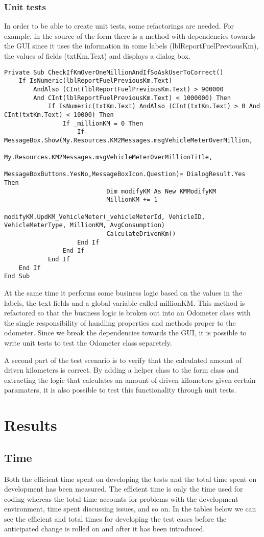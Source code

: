 \documentclass{article}
\begin{document}
			\subsubsection{Unit tests}

			In order to be able to create unit tests, some refactorings are needed. For example, in the source of the form there is a method with dependencies towards the GUI since it uses the information in some labels (lblReportFuelPreviousKm), the values of fields (txtKm.Text) and displays a dialog box.
			\begin{lstlisting}
Private Sub CheckIfKmOverOneMillionAndIfSoAskUserToCorrect()
	If IsNumeric(lblReportFuelPreviousKm.Text) 
		AndAlso (CInt(lblReportFuelPreviousKm.Text) > 900000 	
		And CInt(lblReportFuelPreviousKm.Text) < 1000000) Then
			If IsNumeric(txtKm.Text) AndAlso (CInt(txtKm.Text) > 0 And CInt(txtKm.Text) < 10000) Then
				If _millionKM = 0 Then
					If MessageBox.Show(My.Resources.KM2Messages.msgVehicleMeterOverMillion,
						My.Resources.KM2Messages.msgVehicleMeterOverMillionTitle,
						MessageBoxButtons.YesNo,MessageBoxIcon.Question)= DialogResult.Yes Then
							Dim modifyKM As New KMModifyKM 
							MillionKM += 1
							modifyKM.UpdKM_VehicleMeter(_vehicleMeterId, VehicleID, VehicleMeterType, MillionKM, AvgConsumption)
							CalculateDrivenKm()
					End If
				End If
			End If
	End If
End Sub
		\end{lstlisting}

			At the same time it performs some business logic based on the values in the labels, the text fields and a global variable called millionKM.
			This method is refactored so that the business logic is broken out into an Odometer class with the single responsibility of handling properties and methods proper to the odometer. Since we break the dependencies towards the GUI, it is possible to write unit tests to test the Odometer class separetely.

			A second part of the test scenario is to verify that the calculated amount of driven kilometers is correct. By adding a helper class to the form class and extracting the logic that calculates an amount of driven kilometers given certain paramaters, it is also possible to test this functionality through unit tests.

	\section{Results}
		\subsection{Time}
		Both the efficient time spent on developing the tests and the total time spent on development has been measured. The efficient time is only the time used for coding whereas the total time accounts for problems with the development environment, time spent discussing issues, and so on.
		In the tables below we can see the efficient and total times for developing the test cases before the anticipated change is rolled on and after it has been introduced.
\end{document}
